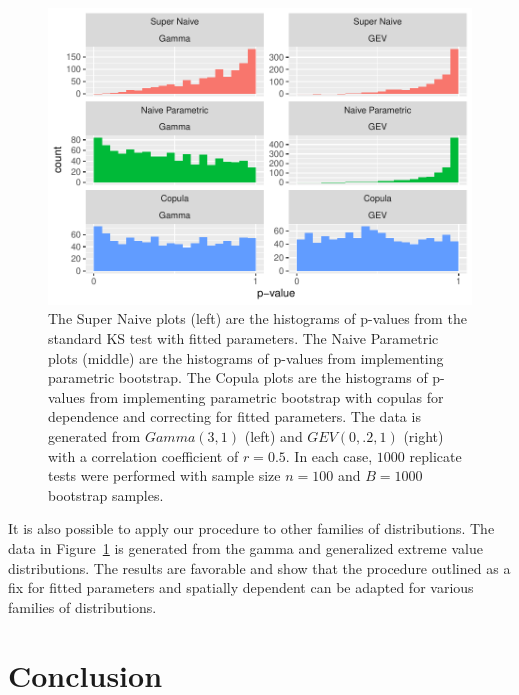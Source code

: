 \documentclass[12pt, letterpaper, titlepage]{article}
\begin{document}
\begin{figure}[tbp]
  \centering
  \includegraphics[width=\textwidth]{hist_gamma_gev_FD}
  \caption{The Super Naive plots (left) are the histograms of p-values from the 
  standard KS test with fitted parameters. The Naive Parametric plots (middle) 
  are the histograms of p-values from implementing parametric bootstrap. The 
  Copula plots are the histograms of p-values from implementing parametric 
  bootstrap with copulas for dependence and correcting for fitted parameters. 
  The data is generated from $Gamma(3, 1)$ (left) and $GEV(0, .2, 1)$ (right) 
  with a correlation coefficient of $r = 0.5$. In each case, $1000$ replicate 
  tests were performed with sample size $n = 100$ and $B = 1000$ bootstrap 
  samples.}
  \label{fig:hist_gamma_gev_FD}
\end{figure}

It is also possible to apply our procedure to other families of distributions. 
The data in Figure~\ref{fig:hist_gamma_gev_FD} is generated from the gamma and 
generalized extreme value distributions. The results are favorable and show that 
the procedure outlined as a fix for fitted parameters and spatially dependent 
can be adapted for various families of distributions.


\section{Conclusion}
\label{sec:conclusion}
\end{document}
